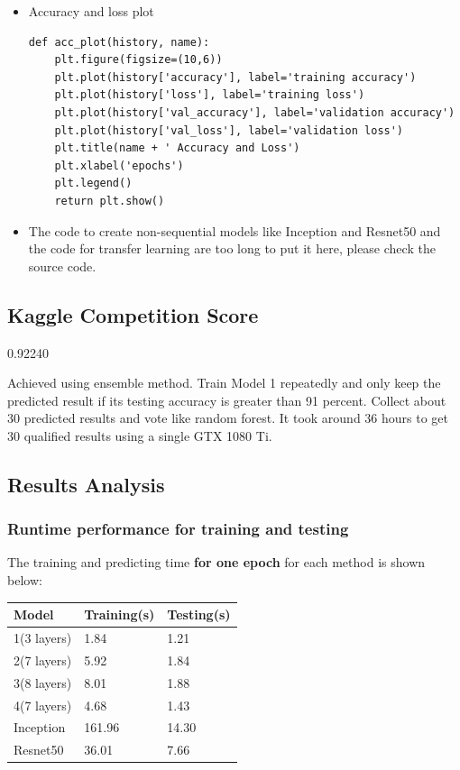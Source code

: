 \documentclass[12pt]{article}
\begin{document}
\begin{singlespacing}
\begin{itemize}
\item Accuracy and loss plot
\begin{verbatim}
def acc_plot(history, name):
    plt.figure(figsize=(10,6))
    plt.plot(history['accuracy'], label='training accuracy')
    plt.plot(history['loss'], label='training loss')    
    plt.plot(history['val_accuracy'], label='validation accuracy')
    plt.plot(history['val_loss'], label='validation loss')
    plt.title(name + ' Accuracy and Loss')
    plt.xlabel('epochs')
    plt.legend()
    return plt.show()
\end{verbatim}

\item The code to create non-sequential models like Inception and Resnet50 and the code for transfer learning are too long to put it here, please check the source code.
\end{itemize}
\end{singlespacing}

\subsection{Kaggle Competition Score}

0.92240

Achieved using ensemble method. Train Model 1 repeatedly and only keep the predicted result if its testing accuracy is greater than 91 percent. Collect about 30 predicted results and vote like random forest. It took around 36 hours to get 30 qualified results using a single GTX 1080 Ti.

\subsection{Results Analysis}

\subsubsection{Runtime performance for training and testing}

The training and predicting time \textbf{for one epoch} for each method is shown below:
\begin{center}
\begin{tabular}{|p{2.5cm}|p{2.5cm}|p{2.5cm}|}
\hline
\textbf{Model} & \textbf{Training(s)} & \textbf{Testing(s)}\\ 
\hline
1(3 layers) & 1.84 & 1.21\\ 
\hline
2(7 layers) & 5.92 & 1.84\\ 
\hline
3(8 layers) & 8.01 & 1.88\\ 
\hline
4(7 layers) & 4.68 & 1.43\\
\hline
Inception & 161.96 & 14.30\\
\hline
Resnet50 & 36.01 & 7.66\\
\hline
\end{tabular}
\end{center}
\end{document}
